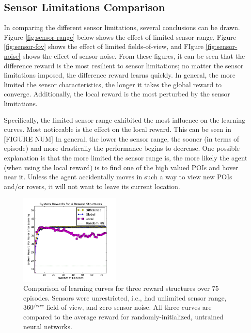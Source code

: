 \documentclass[letterpaper, 10 pt, conference]{ieeeconf}  %
\begin{document}
\subsection{Sensor Limitations Comparison}
In comparing the different sensor limitations, several conclusions can be drawn. Figure \ref{fig:sensor-range} below shows the effect of limited sensor range, Figure \ref{fig:sensor-fov} shows the effect of limited fields-of-view, and FIgure \ref{fig:sensor-noise} shows the effect of sensor noise. From these figures, it can be seen that the difference reward is the most resilient to sensor limitations; no matter the sensor limitations imposed, the difference reward learns quickly. In general, the more limited the sensor characteristics, the longer it takes the global reward to converge. Additionally, the local reward is the most perturbed by the sensor limitations.

Specifically, the limited sensor range exhibited the most influence on the learning curves. Most noticeable is the effect on the local reward. This can be seen in [FIGURE NUM] In general, the lower the sensor range, the sooner (in terms of episode) and more drastically the performance begins to decrease. One possible explanation is that the more limited the sensor range is, the more likely the agent (when using the local reward) is to find one of the high valued POIs and hover near it. Unless the agent accidentally moves in such a way to view new POIs and/or rovers, it will not want to leave its current location.

\begin{figure}[h!]
    \centering
    \includegraphics[width=0.45\textwidth]{baseline.png}
    \caption{Comparison of learning curves for three reward structures over 75 episodes. Sensors were unrestricted, i.e., had unlimited sensor range, 360$^{/circ}$ field-of-view, and zero sensor noise. All three curves are compared to the average reward for randomly-initialized, untrained neural networks. }
    \label{fig:baseline}
\end{figure}
\end{document}
